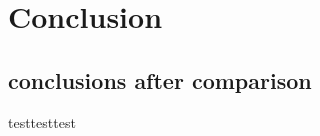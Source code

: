 \part{Conclusion} \label{part:how is the conclusion}

\chapter{conclusions after comparison}

testtesttest\\